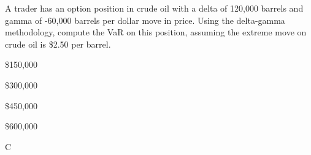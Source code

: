 \documentclass{article}
\newcounter{question} %
\begin{document}
    

\begin{question}
    A trader has an option position in crude oil with a delta of 120,000 barrels and gamma of -60,000 barrels per dollar move in price. Using the delta-gamma methodology, compute the VaR on this position, assuming the extreme move on crude oil is \$2.50 per barrel.
\end{question}

\begin{choices}
    \item \$150,000
    \item \$300,000
    \item \$450,000
    \item \$600,000
\end{choices}

\begin{correctanswer}
    C
\end{correctanswer}
\end{document}
